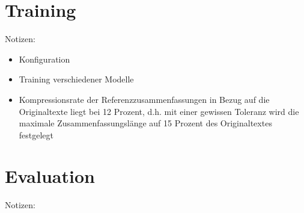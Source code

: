 \section{Training}
Notizen:
\begin{itemize}
	\item Konfiguration
	\item Training verschiedener Modelle
	\item Kompressionsrate der Referenzzusammenfassungen in Bezug auf die Originaltexte liegt bei 12 Prozent, d.h. mit einer gewissen Toleranz wird die maximale Zusammenfassungslänge auf 15 Prozent des Originaltextes festgelegt
\end{itemize}


\section{Evaluation}
Notizen:
